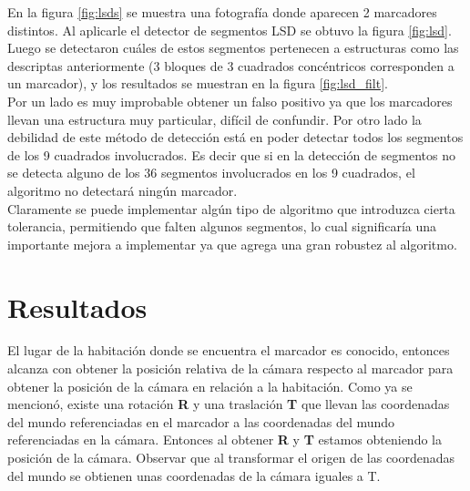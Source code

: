 \documentclass[main]{subfiles}
\begin{document}
En la figura \ref{fig:lsds} se muestra una fotografía donde aparecen 2 marcadores distintos. Al aplicarle el detector de segmentos LSD se obtuvo la figura \ref{fig:lsd}. Luego se detectaron cuáles de estos segmentos pertenecen a estructuras como las descriptas anteriormente (3 bloques de 3 cuadrados concéntricos corresponden a un marcador), y los resultados se muestran en la figura \ref{fig:lsd_filt}.\\

Por un lado es muy improbable obtener un falso positivo ya que los marcadores llevan una estructura muy particular, difícil de confundir. Por otro lado la debilidad de este método de detección está en poder detectar todos los segmentos de los 9 cuadrados involucrados. Es decir que si en la detección de segmentos no se detecta alguno de los 36 segmentos involucrados en los 9 cuadrados, el algoritmo no detectará ningún marcador.\\

Claramente se puede implementar algún tipo de algoritmo que introduzca cierta tolerancia, permitiendo que falten algunos segmentos, lo cual significaría una importante mejora a implementar ya que agrega una gran robustez al algoritmo.

\section{Resultados}

El lugar de la habitación donde se encuentra el marcador es conocido, entonces alcanza con obtener la posición relativa de la cámara respecto al marcador para obtener la posición de la cámara en relación a la habitación. Como ya se mencionó, existe una rotación \textbf{R} y una traslación \textbf{T} que llevan las coordenadas del mundo referenciadas en el marcador a las coordenadas del mundo referenciadas en la cámara. Entonces al obtener \textbf{R} y \textbf{T} estamos obteniendo la posición de la cámara. Observar que al transformar el origen de las coordenadas del mundo se obtienen unas coordenadas de la cámara iguales a T.\\
\end{document}
